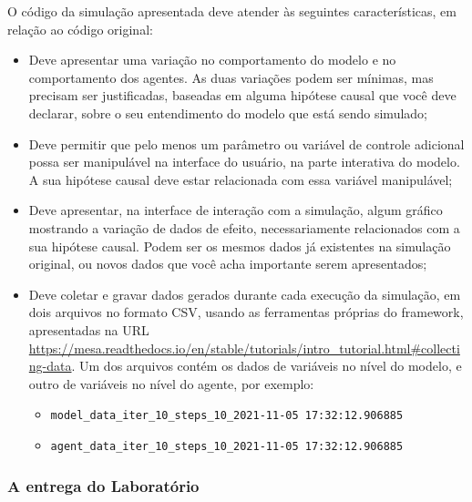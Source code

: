 O código da simulação apresentada deve atender às seguintes características, em relação ao código original:
\begin{itemize}
    \item Deve apresentar uma variação no comportamento do modelo e no comportamento dos agentes. As duas variações podem ser mínimas, mas precisam ser justificadas, baseadas em alguma hipótese causal que você deve declarar, sobre o seu entendimento do modelo que está sendo simulado;
    \item Deve permitir que pelo menos um parâmetro ou variável de controle adicional possa ser manipulável na interface do usuário, na parte interativa do modelo. A sua hipótese causal deve estar relacionada com essa variável manipulável;
    \item Deve apresentar, na interface de interação com a simulação, algum gráfico mostrando a variação de dados de efeito, necessariamente relacionados com a sua hipótese causal. Podem ser os mesmos dados já existentes na simulação original, ou novos dados que você acha importante serem apresentados;
    \item Deve coletar e gravar dados gerados durante cada execução da simulação, em dois arquivos no formato CSV, usando as ferramentas próprias do framework, apresentadas na URL \url{https://mesa.readthedocs.io/en/stable/tutorials/intro_tutorial.html#collecting-data}. Um dos arquivos contém os dados de variáveis no nível do modelo, e outro de variáveis no nível do agente, por exemplo:
    \begin{itemize}
        \item \verb|model_data_iter_10_steps_10_2021-11-05 17:32:12.906885|
        \item \verb|agent_data_iter_10_steps_10_2021-11-05 17:32:12.906885|
    \end{itemize}
\end{itemize}

\subsubsection{A entrega do Laboratório}

